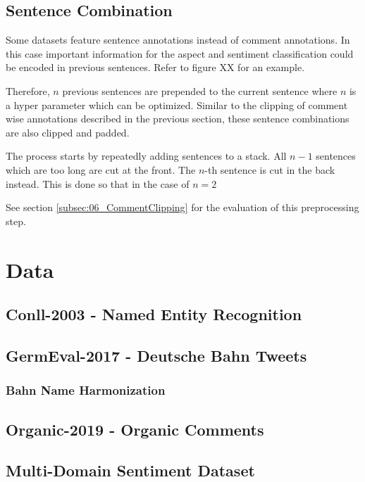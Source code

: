 \subsection{Sentence Combination}

Some datasets feature sentence annotations instead of comment annotations. In this case important information for the aspect and sentiment classification could be encoded in previous sentences. Refer to figure XX for an example.

Therefore, $n$ previous sentences are prepended to the current sentence where $n$ is a hyper parameter which can be optimized. Similar to the clipping of comment wise annotations described in the previous section, these sentence combinations are also clipped and padded. 

The process starts by repeatedly adding sentences to a stack. All $n-1$ sentences which are too long are cut at the front. The $n$-th sentence is cut in the back instead. This is done so that in the case of $n=2$ 


See section \ref{subsec:06_CommentClipping} for the evaluation of this preprocessing step.

\section{Data}
\label{sec:05_Data}


\subsection{Conll-2003 - Named Entity Recognition}
\subsection{GermEval-2017 - Deutsche Bahn Tweets}
\subsubsection*{Bahn Name Harmonization}
\subsection{Organic-2019 - Organic Comments}
\subsection{Multi-Domain Sentiment Dataset}
\cite{Blitzer2007}

